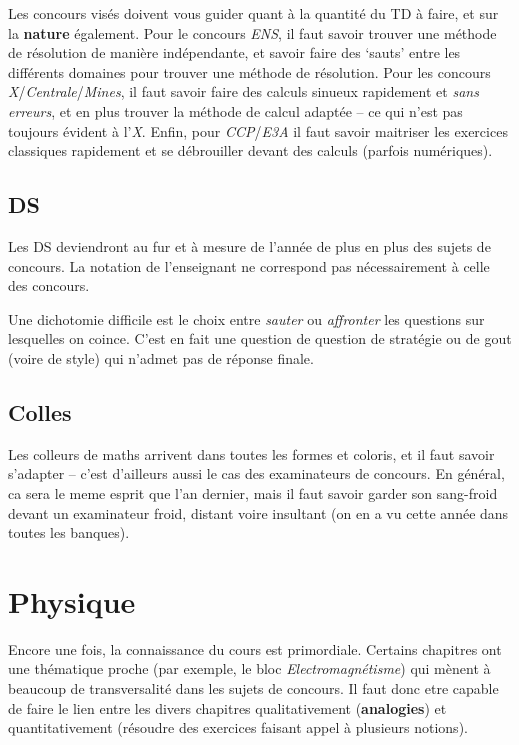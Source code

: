 \documentclass{article}
\begin{document}
Les concours visés doivent vous guider quant à la quantité du TD à faire, et sur la \textbf{nature} également.
Pour le concours \textit{ENS}, il faut savoir trouver une méthode de résolution de manière indépendante, et savoir faire des `sauts' entre les différents domaines pour trouver une méthode de résolution.
Pour les concours \textit{X}/\textit{Centrale}/\textit{Mines}, il faut savoir faire des calculs sinueux rapidement et \textit{sans erreurs}, et en plus trouver la méthode de calcul adaptée -- ce qui n'est pas toujours évident à l'\textit{X}.
Enfin, pour \textit{CCP}/\textit{E3A} il faut savoir maitriser les exercices classiques rapidement et se débrouiller devant des calculs (parfois numériques).

\subsection{DS}
Les DS deviendront au fur et à mesure de l'année de plus en plus des sujets de concours.
La notation de l'enseignant ne correspond pas nécessairement à celle des concours.

Une dichotomie difficile est le choix entre \textit{sauter} ou \textit{affronter} les questions sur lesquelles on coince.
C'est en fait une question de question de stratégie ou de gout (voire de style) qui n'admet pas de réponse finale.

\subsection{Colles}
Les colleurs de maths arrivent dans toutes les formes et coloris, et il faut savoir s'adapter -- c'est d'ailleurs aussi le cas des examinateurs de concours.
En général, ca sera le meme esprit que l'an dernier, mais il faut savoir garder son sang-froid devant un examinateur froid, distant voire insultant (on en a vu cette année dans toutes les banques).

\section{Physique}
Encore une fois, la connaissance du cours est primordiale.
Certains chapitres ont une thématique proche (par exemple, le bloc \textit{Electromagnétisme}) qui mènent à beaucoup de transversalité dans les sujets de concours.
Il faut donc etre capable de faire le lien entre les divers chapitres qualitativement (\textbf{analogies}) et quantitativement (résoudre des exercices faisant appel à plusieurs notions).
\end{document}
